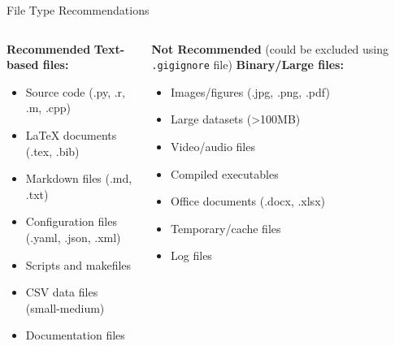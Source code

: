\documentclass[aspectratio=1609]{beamer}
\begin{document}
    \begin{frame}{File Type Recommendations}

\begin{columns}[t]
\begin{column}{0.48\textwidth}
    \begin{texample}{{\textbf{Recommended}}}
    \textbf{Text-based files:}
    \begin{itemize}
        \item Source code (.py, .r, .m, .cpp)
        \item LaTeX documents (.tex, .bib)
        \item Markdown files (.md, .txt)
        \item Configuration files (.yaml, .json, .xml)
        \item Scripts and makefiles
        \item CSV data files (small-medium)
        \item Documentation files
    \end{itemize}
    \end{texample}
\end{column}
\begin{column}{0.48\textwidth}
    \begin{talert}{\textbf{ Not Recommended} (could be excluded using \texttt{.gigignore} file)}
    \textbf{Binary/Large files:}
    \begin{itemize}
        \item Images/figures (.jpg, .png, .pdf)
        \item Large datasets (>100MB)
        \item Video/audio files
        \item Compiled executables
        \item Office documents (.docx, .xlsx)
        \item Temporary/cache files
        \item Log files
    \end{itemize}
    \end{talert}
\end{column}
\end{columns}
\end{frame}
\end{document}
